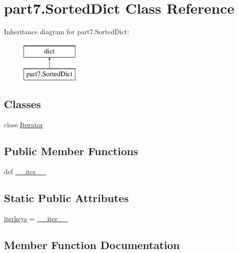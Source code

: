 \hypertarget{classpart7_1_1SortedDict}{}\section{part7.\+Sorted\+Dict Class Reference}
\label{classpart7_1_1SortedDict}
Inheritance diagram for part7.\+Sorted\+Dict\+:\begin{figure}[H]
\begin{center}
\leavevmode
\includegraphics[height=2.000000cm]{classpart7_1_1SortedDict}
\end{center}
\end{figure}
\subsection*{Classes}
\begin{DoxyCompactItemize}
\item 
class \hyperlink{classpart7_1_1SortedDict_1_1Iterator}{Iterator}
\end{DoxyCompactItemize}
\subsection*{Public Member Functions}
\begin{DoxyCompactItemize}
\item 
def \hyperlink{classpart7_1_1SortedDict_af3baee1f38c982ed3828c59d3a5356a1}{\+\_\+\+\_\+iter\+\_\+\+\_\+}
\end{DoxyCompactItemize}
\subsection*{Static Public Attributes}
\begin{DoxyCompactItemize}
\item 
\hyperlink{classpart7_1_1SortedDict_ae1ca1b1676ff1dfb5ff9aecf04c5ff61}{iterkeys} = \hyperlink{classpart7_1_1SortedDict_af3baee1f38c982ed3828c59d3a5356a1}{\+\_\+\+\_\+iter\+\_\+\+\_\+}
\end{DoxyCompactItemize}


\subsection{Member Function Documentation}
\hypertarget{classpart7_1_1SortedDict_af3baee1f38c982ed3828c59d3a5356a1}{}
